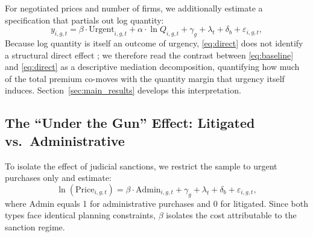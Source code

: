 For negotiated prices and number of firms, we additionally estimate a specification that partials out log quantity:
\begin{equation}
\label{eq:direct}
y_{i,g,t} = \beta \cdot \text{Urgent}_{i,g,t} + \alpha \cdot \ln Q_{i,g,t} + \gamma_g + \lambda_t + \delta_b + \varepsilon_{i,g,t},
\end{equation}
Because log quantity is itself an outcome of urgency, \eqref{eq:direct} does not identify a structural direct effect \citep{acharya2016explaining}; we therefore read the contrast between \eqref{eq:baseline} and \eqref{eq:direct} as a descriptive mediation decomposition, quantifying how much of the total premium co-moves with the quantity margin that urgency itself induces. Section~\ref{sec:main_results} develops this interpretation.

\subsection{The ``Under the Gun'' Effect: Litigated vs.\ Administrative}

To isolate the effect of judicial sanctions, we restrict the sample to urgent purchases only and estimate:
\begin{equation}
\label{eq:utg}
\ln(\text{Price}_{i,g,t}) = \beta \cdot \text{Admin}_{i,g,t} + \gamma_g + \lambda_t + \delta_b + \varepsilon_{i,g,t},
\end{equation}
where $\text{Admin}$ equals 1 for administrative purchases and 0 for litigated. Since both types face identical planning constraints, $\beta$ isolates the cost attributable to the sanction regime.
